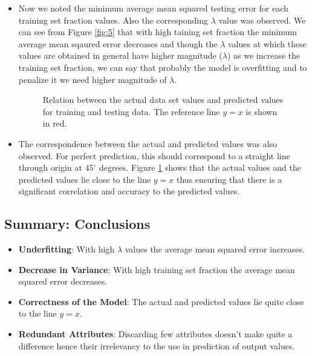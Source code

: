 \documentclass{article}
\begin{document}
\begin{itemize}
\item Now we noted the minimum average mean squared testing error for each training set fraction values. Also the corresponding $\lambda$ value was observed. We can see from Figure \ref{fig:5} that with high taining set fraction the minimum average mean sqaured error decreases and though the $\lambda$ values at which these values are obtained  in general have higher magnitude ($\lambda$) as we increase the training set fraction, we can say that probably the model is overfitting and to penalize it we need higher magnitude of $\lambda$.

\begin{figure}[H]
 \caption{Relation between the actual data set values and predicted values for training and testing data. The reference line $y=x$ is shown in red.}
 \label{fig:6}
 \end{figure}
 
\item The correspondence between the actual and predicted values was also observed. For perfect prediction, this should correspond to a straight line through origin at $45^\circ$ degrees. Figure \ref{fig:6} shows that the actual values and the predicted values lie close to the line $y=x$ thus ensuring that there is a significant correlation and accuracy to the predicted values.
 
\end{itemize}

\subsection*{Summary: Conclusions}
\begin{itemize}
\item {\bf Underfitting}: With high $\lambda$ values the average mean squared error increases.
\item {\bf Decrease in Variance}: With high training set fraction the average mean squared error decreases.
\item {\bf Correctness of the Model}: The actual and predicted values lie quite close to the line $y=x$.
\item {\bf Redundant Attributes}: Discarding few attributes doesn't make quite a difference hence their irrelevancy to the use in prediction of output values.
\end{itemize}
\end{document}
